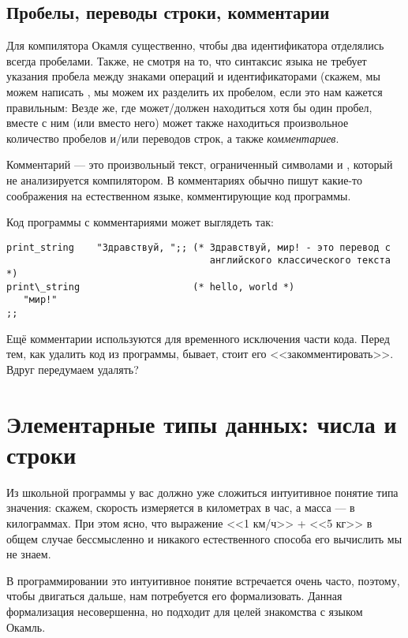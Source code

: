\subsection{Пробелы, переводы строки, комментарии}

Для компилятора Окамля существенно, чтобы два идентификатора 
отделялись всегда пробелами. Также, не смотря на то, что синтаксис языка не 
требует указания пробела между знаками операций и идентификаторами
(скажем, мы можем написать , мы можем их разделить
их пробелом, если это нам кажется правильным: 
Везде же, где может/должен находиться хотя бы один 
пробел, вместе с ним (или вместо него) может также находиться произвольное 
количество пробелов и/или переводов строк, а также \emph{комментариев}.

Комментарий --- это произвольный текст, ограниченный символами 
\s{(*} и \s{*)}, который не анализируется компилятором. В комментариях
обычно пишут какие-то соображения на естественном языке, 
комментирующие код программы. 

Код программы с комментариями может выглядеть так:

\begin{verbatim}
print_string    "Здравствуй, ";; (* Здравствуй, мир! - это перевод с 
                                    английского классического текста *)
print\_string                    (* hello, world *)
   "мир!"
;;		 
\end{verbatim}

Ещё комментарии используются для временного исключения части кода. Перед
тем, как удалить код из программы, бывает, стоит его <<закомментировать>>. 
Вдруг передумаем удалять?

\section{Элементарные типы данных: числа и строки}

Из школьной программы у вас должно уже сложиться интуитивное понятие типа
значения: скажем, скорость измеряется в километрах в час, а масса ---
в килограммах. При этом ясно, что выражение <<1 км/ч>> + <<5 кг>> 
в общем случае бессмысленно и никакого естественного способа его вычислить 
мы не знаем.

В программировании это интуитивное понятие встречается очень часто, поэтому,
чтобы двигаться дальше, нам потребуется его формализовать. Данная 
формализация несовершенна, но подходит для целей знакомства с
языком Окамль.

